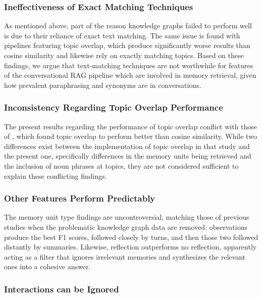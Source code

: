 \subsubsection{Ineffectiveness of Exact Matching Techniques}

As mentioned above, part of the reason knowledge graphs failed to perform well is due to their reliance of exact text matching. The same issue is found with pipelines featuring topic overlap, which produce significantly worse results than cosine similarity and likewise rely on exactly matching topics. Based on these findings, we argue that text-matching techniques are not worthwhile for features of the conversational RAG pipeline which are involved in memory retrieval, given how prevalent paraphrasing and synonyms are in conversations.


\subsubsection{Inconsistency Regarding Topic Overlap Performance}

The present results regarding the performance of topic overlap conflict with those of \cite{Li2024}, which found topic overlap to perform better than cosine similarity. While two differences exist between the implementation of topic overlap in that study and the present one, specifically differences in the memory units being retrieved and the inclusion of noun phrases at topics, they are not considered sufficient to explain these conflicting findings.


\subsubsection{Other Features Perform Predictably}

The memory unit type findings are uncontroversial, matching those of previous studies when the problematic knowledge graph data are removed: observations produce the best F1 scores, followed closely by turns, and then those two followed distantly by summaries. Likewise, reflection outperforms no reflection, apparently acting as a filter that ignores irrelevant memories and synthesizes the relevant ones into a cohesive answer. 


\subsubsection{Interactions can be Ignored}

